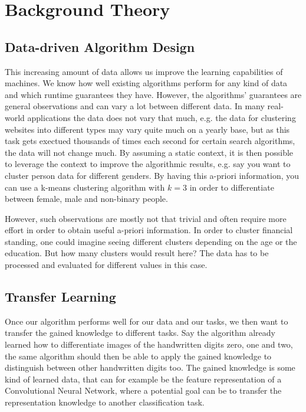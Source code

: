 \chapter{Background Theory}
\label{chapter:background}

\section{Data-driven Algorithm Design}

This increasing amount of data allows us improve the learning capabilities of machines. We know how well existing algorithms perform for any kind of data and which runtime guarantees they have. However, the algorithms' guarantees are general observations and can vary a lot between different data. In many real-world applications the data does not vary that much, e.g. the data for clustering websites into different types may vary quite much on a yearly base, but as this task gets exectued thousands of times each second for certain search algorithms, the data will not change much. By assuming a static context, it is then possible to leverage the context to improve the algorithmic results, e.g. say you want to cluster person data for different genders. By having this a-priori information, you can use a k-means clustering algorithm with $k = 3$ in order to differentiate between female, male and non-binary people.

However, such observations are mostly not that trivial and often require more effort in order to obtain useful a-priori information. In order to cluster financial standing, one could imagine seeing different clusters depending on the age or the education. But how many clusters would result here? The data has to be processed and evaluated for different values in this case.

\section{Transfer Learning}

Once our algorithm performs well for our data and our tasks, we then want to transfer the gained knowledge to different tasks. Say the algorithm already learned how to differentiate images of the handwritten digits zero, one and two, the same algorithm should then be able to apply the gained knowledge to distinguish between other handwritten digits too. The gained knowledge is some kind of learned data, that can for example be the feature representation of a Convolutional Neural Network, where a potential goal can be to transfer the representation knowledge to another classification task.

